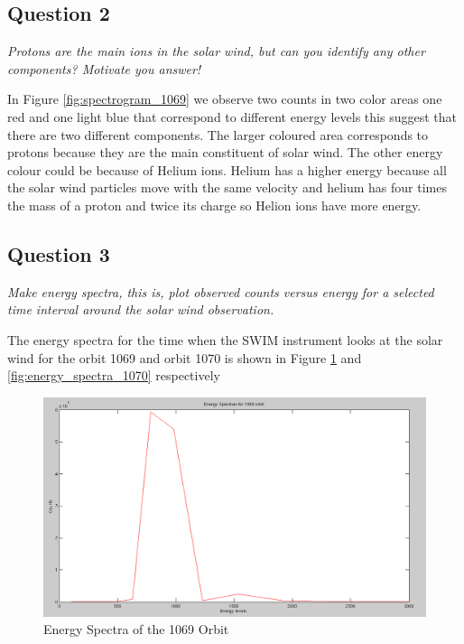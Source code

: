\documentclass{article}
\begin{document}
\subsection{Question 2}
\textit{Protons are the main ions in the solar wind, but can you identify any other
components? Motivate you answer!}

In Figure \ref{fig:spectrogram_1069} we observe two counts in two color areas one red and one light blue that correspond to different energy levels this suggest that there are two different components. The larger coloured area corresponds to protons because they are the main constituent of solar wind. The other energy colour could be because of Helium ions. Helium has a higher energy because all the solar wind particles move with the same velocity and helium has four times the mass of a proton and twice its charge so Helion ions have more energy.

\subsection{Question 3}
\textit{Make energy spectra, this is, plot observed counts versus energy for a selected
time interval around the solar wind observation.}

The energy spectra for the time when the SWIM instrument looks at the solar wind for the orbit 1069 and orbit 1070 is shown in Figure \ref{fig:energy_spectra_1069} and \ref{fig:energy_spectra_1070} respectively

\begin{figure}[htb!]
\centering
\includegraphics[scale = 0.35]{Figures/energy_spectra_1069.png}
\caption{Energy Spectra of the 1069 Orbit}
\label{fig:energy_spectra_1069}
\end{figure}
\end{document}
